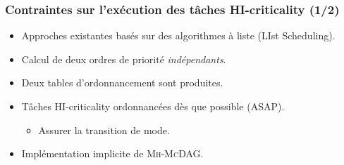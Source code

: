 \documentclass[xcolor=table]{beamer}
\begin{document}

\begin{frame}
	\frametitle{Contraintes sur l'exécution des tâches HI-criticality (1/2)}
	\setcounter{subfigure}{0}
	\begin{itemize}
		\item Approches existantes basés sur des algorithmes à liste (LIst Scheduling).
		\item Calcul de deux ordres de priorité \emph{indépendants}.
		\item Deux tables d'ordonnancement sont produites.
		\item Tâches HI-criticality ordonnancées dès que possible (ASAP).
		\begin{itemize}
			\item Assurer la transition de mode.
		\end{itemize}
		\item Implémentation implicite de \textsc{Mh-McDAG}.
	\end{itemize}
	
\end{frame}

\end{document}

